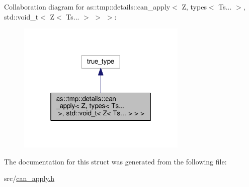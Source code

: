 Collaboration diagram for as\+:\+:tmp\+:\+:details\+:\+:can\+\_\+apply$<$ Z, types$<$ Ts... $>$, std\+:\+:void\+\_\+t$<$ Z$<$ Ts... $>$ $>$ $>$\+:\nopagebreak
\begin{figure}[H]
\begin{center}
\leavevmode
\includegraphics[width=229pt]{structas_1_1tmp_1_1details_1_1can__apply_3_01Z_00_01types_3_01Ts_8_8_8_01_4_00_01std_1_1void__t_5dee29e932352e51efcbc7ee5aec093f}
\end{center}
\end{figure}


The documentation for this struct was generated from the following file\+:\begin{DoxyCompactItemize}
\item 
src/\hyperlink{can__apply_8h}{can\+\_\+apply.\+h}\end{DoxyCompactItemize}
